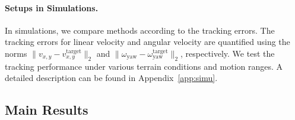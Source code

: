 \paragraph{Setups in Simulations.} 
In simulations, we compare methods according to the tracking errors. 
The tracking errors for linear velocity and angular velocity are quantified using the norms $\|v_{x,y} - v_{x,y}^{\text{target}}\|_2$ and $\|\omega_{\text{yaw}} - \omega_{\text{yaw}}^{\text{target}}\|_2$, respectively. 
We test the tracking performance under various terrain conditions and motion ranges. 
A detailed description can be found in Appendix~\ref{app:simu}.

\subsection{Main Results}
\begin{table}[t]
\vspace{-1cm}
\centering
\caption{Main results with average performance~$\uparrow$ in the real-world benchmarks over 20 trials, where $\pm$ captures a $95\%$ confidence interval. The top results are highlighted.
}
\end{table}
